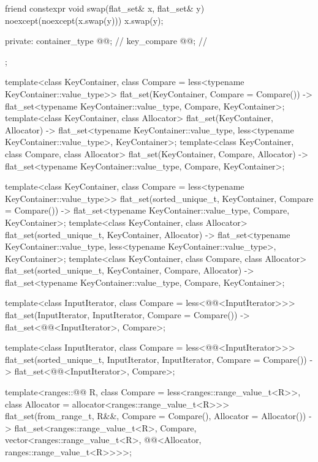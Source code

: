 \begin{codeblock}
{{    friend constexpr void swap(flat_set& x, flat_set& y) noexcept(noexcept(x.swap(y)))
      { x.swap(y); }

  private:
    container_type @@;           // \expos
    key_compare @@;        // \expos
  };

  template<class KeyContainer, class Compare = less<typename KeyContainer::value_type>>
    flat_set(KeyContainer, Compare = Compare())
      -> flat_set<typename KeyContainer::value_type, Compare, KeyContainer>;
  template<class KeyContainer, class Allocator>
    flat_set(KeyContainer, Allocator)
      -> flat_set<typename KeyContainer::value_type,
                  less<typename KeyContainer::value_type>, KeyContainer>;
  template<class KeyContainer, class Compare, class Allocator>
    flat_set(KeyContainer, Compare, Allocator)
      -> flat_set<typename KeyContainer::value_type, Compare, KeyContainer>;

  template<class KeyContainer, class Compare = less<typename KeyContainer::value_type>>
    flat_set(sorted_unique_t, KeyContainer, Compare = Compare())
      -> flat_set<typename KeyContainer::value_type, Compare, KeyContainer>;
  template<class KeyContainer, class Allocator>
    flat_set(sorted_unique_t, KeyContainer, Allocator)
      -> flat_set<typename KeyContainer::value_type,
                  less<typename KeyContainer::value_type>, KeyContainer>;
  template<class KeyContainer, class Compare, class Allocator>
    flat_set(sorted_unique_t, KeyContainer, Compare, Allocator)
      -> flat_set<typename KeyContainer::value_type, Compare, KeyContainer>;

  template<class InputIterator, class Compare = less<@@<InputIterator>>>
    flat_set(InputIterator, InputIterator, Compare = Compare())
      -> flat_set<@@<InputIterator>, Compare>;

  template<class InputIterator, class Compare = less<@@<InputIterator>>>
    flat_set(sorted_unique_t, InputIterator, InputIterator, Compare = Compare())
      -> flat_set<@@<InputIterator>, Compare>;

  template<ranges::@@ R, class Compare = less<ranges::range_value_t<R>>,
           class Allocator = allocator<ranges::range_value_t<R>>>
    flat_set(from_range_t, R&&, Compare = Compare(), Allocator = Allocator())
      -> flat_set<ranges::range_value_t<R>, Compare,
                  vector<ranges::range_value_t<R>,
                         @@<Allocator, ranges::range_value_t<R>>>>;

}
\end{codeblock}
